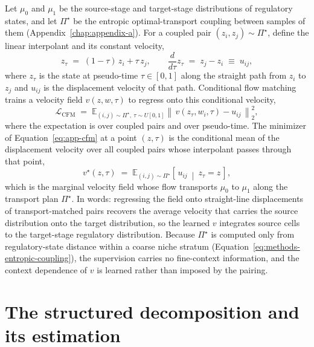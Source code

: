 Let $\mu_0$ and $\mu_1$ be the source-stage and target-stage distributions of regulatory states, and let
$\Pi^{\star}$ be the entropic optimal-transport coupling between samples of them
(Appendix~\ref{chap:appendix-a}). For a coupled pair $(z_i, z_j) \sim \Pi^{\star}$, define the linear
interpolant and its constant velocity,
\begin{equation}\label{eq:app-interp}
z_\tau \;=\; (1-\tau)\, z_i + \tau\, z_j ,
\qquad
\frac{d}{d\tau} z_\tau \;=\; z_j - z_i \;\equiv\; u_{ij} ,
\end{equation}
where $z_\tau$ is the state at pseudo-time $\tau \in [0,1]$ along the straight path from $z_i$ to $z_j$
and $u_{ij}$ is the displacement velocity of that path. Conditional flow matching \autocite{Lipman2022-ns} trains a
velocity field $v(z, w, \tau)$ to regress onto this conditional velocity,
\begin{equation}\label{eq:app-cfm}
\mathcal{L}_{\mathrm{CFM}} \;=\;
\mathbb{E}_{(i,j)\sim\Pi^{\star},\ \tau\sim U[0,1]}
\left\lVert\, v\!\left(z_\tau, w_i, \tau\right) - u_{ij} \,\right\rVert_2^2 ,
\end{equation}
where the expectation is over coupled pairs and over pseudo-time. The minimizer of
Equation~\ref{eq:app-cfm} at a point $(z, \tau)$ is the conditional mean of the displacement velocity
over all coupled pairs whose interpolant passes through that point,
\begin{equation}\label{eq:app-marginal}
v^{\star}(z, \tau) \;=\; \mathbb{E}_{(i,j)\sim\Pi^{\star}}\!\left[\, u_{ij} \ \middle|\ z_\tau = z \,\right] ,
\end{equation}
which is the marginal velocity field whose flow transports $\mu_0$ to $\mu_1$ along the transport plan
$\Pi^{\star}$. In words: regressing the field onto straight-line displacements of transport-matched pairs
recovers the average velocity that carries the source distribution onto the target distribution, so the
learned $v$ integrates source cells to the target-stage regulatory distribution. Because $\Pi^{\star}$
is computed only from regulatory-state distance within a coarse niche stratum
(Equation~\ref{eq:methods-entropic-coupling}), the supervision carries no fine-context information, and the context
dependence of $v$ is learned rather than imposed by the pairing.

\section{The structured decomposition and its estimation}
\label{sec:app-b-decomposition}

